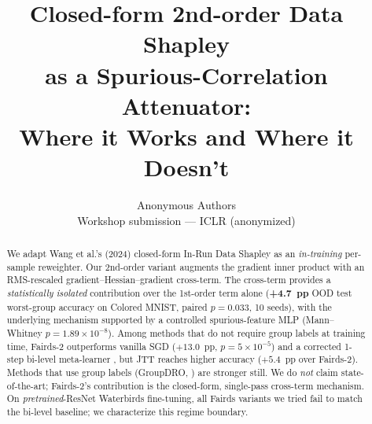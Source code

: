 \documentclass[10pt]{article}
\title{Closed-form 2nd-order Data Shapley\\
       as a Spurious-Correlation Attenuator: \\
       Where it Works and Where it Doesn't}
\author{Anonymous Authors\\\small Workshop submission --- ICLR (anonymized)}
\date{}
\begin{document}
\maketitle

\begin{abstract}
We adapt Wang et al.'s (2024) closed-form In-Run Data Shapley as an
\emph{in-training} per-sample reweighter. Our 2nd-order variant
augments the gradient inner product with an RMS-rescaled
gradient--Hessian--gradient cross-term. The cross-term provides a
\emph{statistically isolated} contribution over the 1st-order term
alone (\textbf{+4.7~pp} OOD test worst-group accuracy on Colored MNIST,
paired $p=0.033$, 10 seeds), with the underlying mechanism supported
by a controlled spurious-feature MLP (Mann--Whitney
$p=1.89\!\times\!10^{-8}$). Among methods that do not require group
labels at training time, Fairds-2 outperforms vanilla SGD
($+13.0$~pp, $p=5\!\times\!10^{-5}$) and a corrected 1-step bi-level
meta-learner \citep{ren2018reweight}, but JTT \citep{liu2021jtt}
reaches higher accuracy ($+5.4$~pp over Fairds-2). Methods that use
group labels (GroupDRO, \citealt{sagawa2020groupdro}) are stronger
still. We do \emph{not} claim state-of-the-art; Fairds-2's contribution
is the closed-form, single-pass cross-term mechanism. On
\emph{pretrained}-ResNet Waterbirds fine-tuning, all Fairds variants
we tried fail to match the bi-level baseline; we characterize this
regime boundary.
\end{abstract}










\appendix

\end{document}
